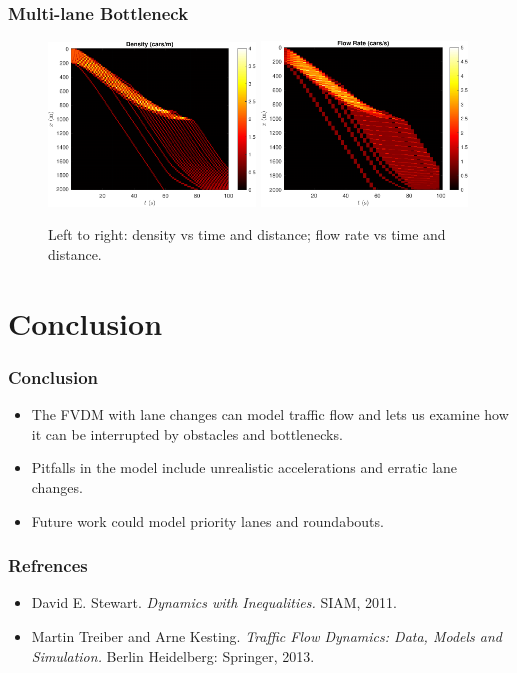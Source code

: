\documentclass{beamer}
\begin{document}
\begin{frame}
  \frametitle{Multi-lane Bottleneck}
  \begin{figure}[H]
    \includegraphics[width=5.5cm]{mlbn_density.pdf}
    \includegraphics[width=5.5cm]{mlbn_flow.pdf}
    \caption{Left to right: density vs time and distance; flow rate vs time and distance.}
\end{figure}
\end{frame}


\section{Conclusion}
\begin{frame}
  \frametitle{Conclusion}
  \begin{itemize}
    \item The FVDM with lane changes can model traffic flow and lets us examine how it can be interrupted by obstacles and bottlenecks. 

    \item Pitfalls in the model include unrealistic accelerations and erratic lane changes.
    
    \item Future work could model priority lanes and roundabouts.
  \end{itemize}
\end{frame}

\begin{frame}
  \frametitle{Refrences}
  \begin{itemize}
    \item David E. Stewart. \textit{Dynamics with Inequalities.} SIAM, 2011. 
    \item Martin Treiber and Arne Kesting. \textit{Traffic Flow Dynamics: Data,
    Models and Simulation.} Berlin Heidelberg: Springer, 2013.
  \end{itemize}
\end{frame}
\end{document}
